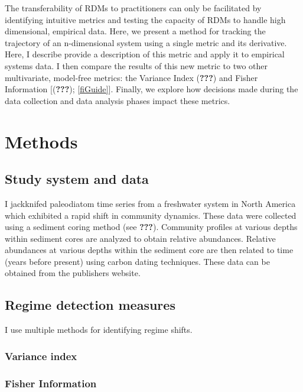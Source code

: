 \documentclass[12pt,twoside,openany]{reedthesis}
\begin{document}
The transferability of RDMs to practitioners can only be facilitated by
identifying intuitive metrics and testing the capacity of RDMs to handle
high dimensional, empirical data. Here, we present a method for tracking
the trajectory of an n-dimensional system using a single metric and its
derivative. Here, I describe provide a description of this metric and
apply it to empirical systems data. I then compare the results of this
new metric to two other multivariate, model-free metrics: the Variance
Index ({\textbf{???}}) and Fisher Information {[}({\textbf{???}});
\ref{fiGuide}{]}. Finally, we explore how decisions made during the data
collection and data analysis phases impact these metrics.

\section{Methods}\label{methods-1}

\subsection{Study system and data}\label{study-system-and-data}

I jackknifed paleodiatom time series from a freshwater system in North
America which exhibited a rapid shift in community dynamics. These data
were collected using a sediment coring method (see {\textbf{???}}).
Community profiles at various depths within sediment cores are analyzed
to obtain relative abundances. Relative abundances at various depths
within the sediment core are then related to time (years before present)
using carbon dating techniques. These data can be obtained from the
publishers website.

\subsection{Regime detection measures}\label{regime-detection-measures}

I use multiple methods for identifying regime shifts.

\subsubsection{Variance index}\label{variance-index}

\subsubsection{Fisher Information}\label{fisher-information}
\end{document}
